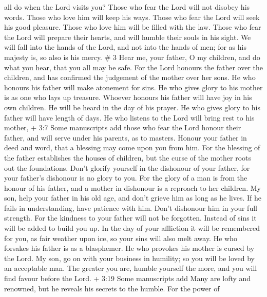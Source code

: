 all do when the Lord visits you?  Those who fear the Lord
will not disobey his words. Those who love him will keep his ways.
 Those who fear the Lord will seek his good pleasure. Those
who love him will be filled with the law.  Those who fear
the Lord will prepare their hearts, and will humble their souls in his
sight.  We will fall into the hands of the Lord, and not
into the hands of men; for as his majesty is, so also is his mercy. \# 3
 Hear me, your father, O my children, and do what you hear,
that you all may be safe.  For the Lord honours the father
over the children, and has confirmed the judgement of the mother over
her sons.  He who honours his father will make atonement for
sins.  He who gives glory to his mother is as one who lays
up treasure.  Whoever honours his father will have joy in
his own children. He will be heard in the day of his prayer.
 He who gives glory to his father will have length of days.
He who listens to the Lord will bring rest to his mother,  +
3:7 Some manuscripts add those who fear the Lord honour their father,
and will serve under his parents, as to masters.  Honour
your father in deed and word, that a blessing may come upon you from
him.  For the blessing of the father establishes the houses
of children, but the curse of the mother roots out the foundations.
 Don't glorify yourself in the dishonour of your father,
for your father's dishonour is no glory to you.  For the
glory of a man is from the honour of his father, and a mother in
dishonour is a reproach to her children.  My son, help your
father in his old age, and don't grieve him as long as he lives.
 If he fails in understanding, have patience with him.
Don't dishonour him in your full strength.  For the
kindness to your father will not be forgotten. Instead of sins it will
be added to build you up.  In the day of your affliction it
will be remembered for you, as fair weather upon ice, so your sins will
also melt away.  He who forsakes his father is as a
blasphemer. He who provokes his mother is cursed by the Lord.
 My son, go on with your business in humility; so you will
be loved by an acceptable man.  The greater you are, humble
yourself the more, and you will find favour before the Lord.
 + 3:19 Some manuscripts add Many are lofty and renowned,
but he reveals his secrets to the humble.  For the power of
